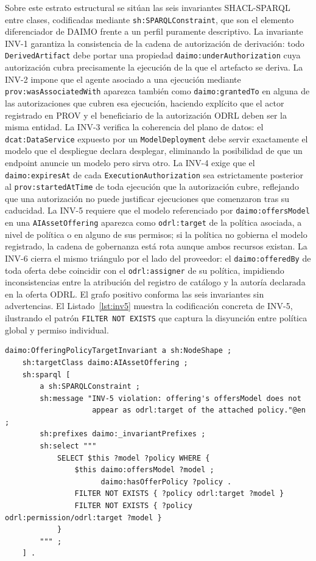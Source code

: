 \documentclass[Afour,sagev,times]{sagej}
\newcommand{\code}[1]{\texttt{#1}}
\begin{document}
Sobre este estrato estructural se sitúan las seis invariantes SHACL-SPARQL entre clases, codificadas mediante \code{sh:SPARQLConstraint}, que son el elemento diferenciador de DAIMO frente a un perfil puramente descriptivo. La invariante INV-1 garantiza la consistencia de la cadena de autorización de derivación: todo \code{DerivedArtifact} debe portar una propiedad \code{daimo:underAuthorization} cuya autorización cubra precisamente la ejecución de la que el artefacto se deriva. La INV-2 impone que el agente asociado a una ejecución mediante \code{prov:wasAssociatedWith} aparezca también como \code{daimo:grantedTo} en alguna de las autorizaciones que cubren esa ejecución, haciendo explícito que el actor registrado en PROV y el beneficiario de la autorización ODRL deben ser la misma entidad. La INV-3 verifica la coherencia del plano de datos: el \code{dcat:DataService} expuesto por un \code{ModelDeployment} debe servir exactamente el modelo que el despliegue declara desplegar, eliminando la posibilidad de que un endpoint anuncie un modelo pero sirva otro. La INV-4 exige que el \code{daimo:expiresAt} de cada \code{ExecutionAuthorization} sea estrictamente posterior al \code{prov:startedAtTime} de toda ejecución que la autorización cubre, reflejando que una autorización no puede justificar ejecuciones que comenzaron tras su caducidad. La INV-5 requiere que el modelo referenciado por \code{daimo:offersModel} en una \code{AIAssetOffering} aparezca como \code{odrl:target} de la política asociada, a nivel de política o en alguno de sus permisos; si la política no gobierna el modelo registrado, la cadena de gobernanza está rota aunque ambos recursos existan. La INV-6 cierra el mismo triángulo por el lado del proveedor: el \code{daimo:offeredBy} de toda oferta debe coincidir con el \code{odrl:assigner} de su política, impidiendo inconsistencias entre la atribución del registro de catálogo y la autoría declarada en la oferta ODRL. El grafo positivo conforma las seis invariantes sin advertencias. El Listado~\ref{lst:inv5} muestra la codificación concreta de INV-5, ilustrando el patrón \code{FILTER NOT EXISTS} que captura la disyunción entre política global y permiso individual.

\begin{lstlisting}[label=lst:inv5,caption={Invariante INV-5 como \code{sh:SPARQLConstraint}.}]
daimo:OfferingPolicyTargetInvariant a sh:NodeShape ;
    sh:targetClass daimo:AIAssetOffering ;
    sh:sparql [
        a sh:SPARQLConstraint ;
        sh:message "INV-5 violation: offering's offersModel does not
                    appear as odrl:target of the attached policy."@en ;
        sh:prefixes daimo:_invariantPrefixes ;
        sh:select """
            SELECT $this ?model ?policy WHERE {
                $this daimo:offersModel ?model ;
                      daimo:hasOfferPolicy ?policy .
                FILTER NOT EXISTS { ?policy odrl:target ?model }
                FILTER NOT EXISTS { ?policy odrl:permission/odrl:target ?model }
            }
        """ ;
    ] .
\end{lstlisting}
\end{document}
